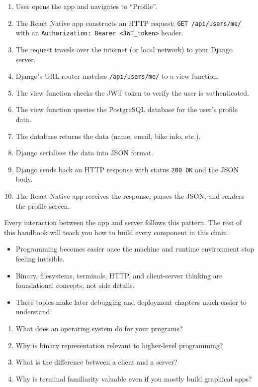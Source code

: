 \documentclass[12pt, a4paper, oneside]{book}
\begin{document}
\begin{enumerate}[leftmargin=2em]
    \item User opens the app and navigates to ``Profile''.
    \item The React Native app constructs an HTTP request: \texttt{GET /api/users/me/} with an \texttt{Authorization: Bearer <JWT\_token>} header.
    \item The request travels over the internet (or local network) to your Django server.
    \item Django's URL router matches \texttt{/api/users/me/} to a view function.
    \item The view function checks the JWT token to verify the user is authenticated.
    \item The view function queries the PostgreSQL database for the user's profile data.
    \item The database returns the data (name, email, bike info, etc.).
    \item Django serialises the data into JSON format.
    \item Django sends back an HTTP response with status \texttt{200 OK} and the JSON body.
    \item The React Native app receives the response, parses the JSON, and renders the profile screen.
\end{enumerate}

Every interaction between the app and server follows this pattern. The rest of this handbook will teach you how to build every component in this chain.

\begin{summarybox}
\begin{itemize}[leftmargin=2em]
    \item Programming becomes easier once the machine and runtime environment stop feeling invisible.
    \item Binary, filesystems, terminals, HTTP, and client-server thinking are foundational concepts, not side details.
    \item These topics make later debugging and deployment chapters much easier to understand.
\end{itemize}
\end{summarybox}

\begin{recallbox}
\begin{enumerate}[leftmargin=2em]
    \item What does an operating system do for your programs?
    \item Why is binary representation relevant to higher-level programming?
    \item What is the difference between a client and a server?
    \item Why is terminal familiarity valuable even if you mostly build graphical apps?
\end{enumerate}
\end{recallbox}
\end{document}

